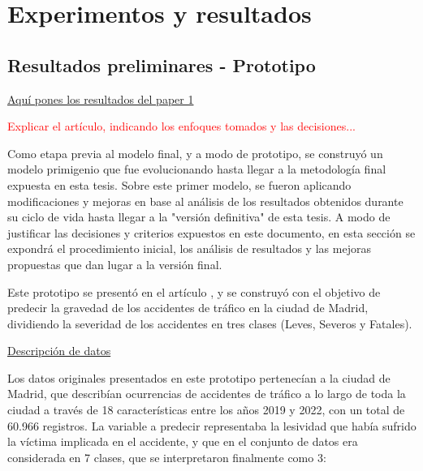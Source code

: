 \documentclass{uathesis-es}
\begin{document}
\chapter{Experimentos y resultados}



\section{Resultados preliminares - Prototipo}

\underline{Aquí pones los resultados del paper 1}


\textcolor{red}{Explicar el artículo, indicando los enfoques tomados y las decisiones...}

Como etapa previa al modelo final, y a modo de prototipo, se construyó un modelo primigenio que fue evolucionando hasta llegar a la metodología final expuesta en esta tesis. Sobre este primer modelo, se fueron aplicando modificaciones y mejoras en base al análisis de los resultados obtenidos durante su ciclo de vida hasta llegar a la "versión definitiva" de esta tesis. A modo de justificar las decisiones y criterios expuestos en este documento, en esta sección se expondrá el procedimiento inicial, los análisis de resultados y las mejoras propuestas que dan lugar a la versión final.



Este prototipo se presentó en el artículo \cite{PEREZSALA2023113245}, y se construyó con el objetivo de predecir la gravedad de los accidentes de tráfico en la ciudad de Madrid, dividiendo la severidad de los accidentes en tres clases (Leves, Severos y Fatales). 


\underline{Descripción de datos}

Los datos originales presentados en este prototipo pertenecían a la ciudad de Madrid, que describían ocurrencias de accidentes de tráfico a lo largo de toda la ciudad a través de 18 características entre los años 2019 y 2022, con un total de 60.966 registros. La variable a predecir representaba la lesividad que había sufrido la víctima implicada en el accidente, y que en el conjunto de datos era considerada en 7 clases, que se interpretaron finalmente como 3:
\end{document}

